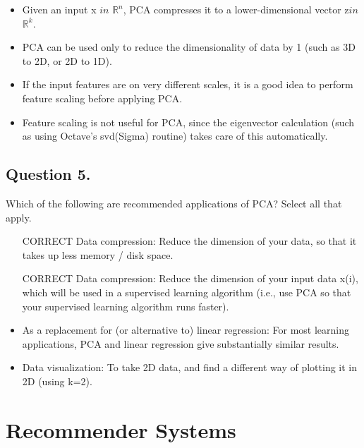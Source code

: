 \begin{itemize}
\item Given an input x $in$ $\mathbb{R}^n$, PCA compresses it to a lower-dimensional vector z$in$ $\mathbb{R}^k$.

\item PCA can be used only to reduce the dimensionality of data by 1 (such as 3D to 2D, or 2D to 1D).

\item If the input features are on very different scales, it is a good idea to perform feature scaling before applying PCA.

\item Feature scaling is not useful for PCA, since the eigenvector calculation (such as using Octave's svd(Sigma) routine) takes care of this automatically.
\end{itemize}
\subsection{ Question 5. }
Which of the following are recommended applications of PCA? Select all that apply.

\begin{itemize}
\item [CORRECT] Data compression: Reduce the dimension of your data, so that it takes up less memory / disk space.

\item [CORRECT] Data compression: Reduce the dimension of your input data x(i), which will be used in a supervised learning algorithm (i.e., use PCA so that your supervised learning algorithm runs faster).

\item As a replacement for (or alternative to) linear regression: For most learning applications, PCA and linear regression give substantially similar results.

\item Data visualization: To take 2D data, and find a different way of plotting it in 2D (using k=2).

\end{itemize}


\section{Recommender Systems}

